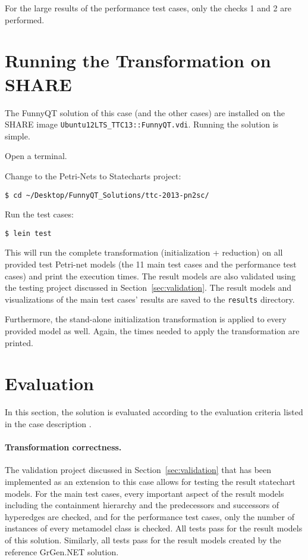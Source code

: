 \documentclass[11pt]{article}
\begin{document}
For the large results of the performance test cases, only the checks 1 and 2
are performed.


\section{Running the Transformation on SHARE}
\label{sec:run-transformation}

The FunnyQT solution of this case (and the other cases) are installed on the
SHARE image \verb|Ubuntu12LTS_TTC13::FunnyQT.vdi|.  Running the solution is
simple.

\begin{compactenum}
\item Open a terminal.
\item Change to the Petri-Nets to Statecharts project:

  \verb|$ cd ~/Desktop/FunnyQT_Solutions/ttc-2013-pn2sc/|
\item Run the test cases:

  \verb|$ lein test|
\end{compactenum}

This will run the complete transformation (initialization + reduction) on all
provided test Petri-net models (the 11 main test cases and the performance test
cases) and print the execution times.  The result models are also validated
using the testing project discussed in Section~\ref{sec:validation}.  The
result models and visualizations of the main test cases' results are saved to
the \verb|results| directory.

Furthermore, the stand-alone initialization transformation is applied to every
provided model as well.  Again, the times needed to apply the transformation
are printed.


\section{Evaluation}
\label{sec:evaluation}

In this section, the solution is evaluated according to the evaluation criteria
listed in the case description \cite{pn2sccasedesc}.

\paragraph{Transformation correctness.}

The validation project discussed in Section~\ref{sec:validation} that has been
implemented as an extension to this case allows for testing the result
statechart models.  For the main test cases, every important aspect of the
result models including the containment hierarchy and the predecessors and
successors of hyperedges are checked, and for the performance test cases, only
the number of instances of every metamodel class is checked.  All tests pass
for the result models of this solution.  Similarly, all tests pass for the
result models created by the reference GrGen.NET solution.
\end{document}
